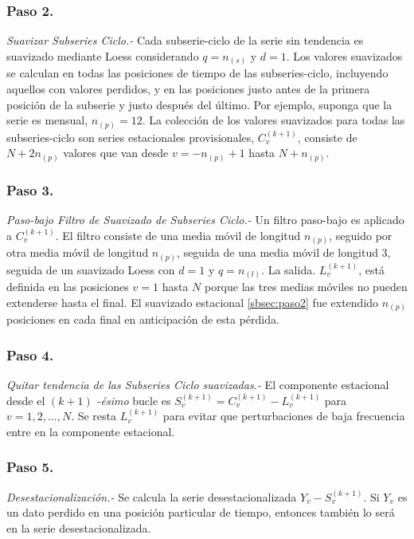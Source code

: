 \documentclass[12pt,oneside]{book}\usepackage[]{graphicx}\usepackage[]{color}
\theoremstyle{definition} %
\begin{document}
\subsubsection{Paso 2.} \textit{Suavizar Subseries Ciclo.-}
\label{sbsec:paso2}
Cada subserie-ciclo de la serie sin tendencia es suavizado mediante Loess considerando $q=n_{(s)}$ y $d=1$. Los valores suavizados se calculan en todas las posiciones de tiempo de las subseries-ciclo, incluyendo aquellos con valores perdidos, y en las posiciones justo antes de la primera posición de la subserie y justo después del último. Por ejemplo, suponga que la serie es mensual, $n_{(p)}=12$. La colección de los valores suavizados para todas las subseries-ciclo son series estacionales provisionales, $C_v^{(k+1)}$, consiste de $N+2n_{(p)}$ valores que van desde $v=-n_{(p)}+1$ hasta $N+n_{(p)}$.  

\subsubsection{Paso 3.} \textit{Paso-bajo Filtro de Suavizado de Subseries Ciclo.-}
\label{sbsec:paso3}
Un filtro paso-bajo es aplicado a $C_v^{(k+1)}$. El filtro consiste de una media móvil de longitud $n_{(p)}$, seguido por otra media móvil de longitud $n_{(p)}$, seguida de una media móvil de longitud $3$, seguida de un suavizado Loess con $d=1$ y $q=n_{(l)}$. La salida. $L_v^{(k+1)}$, está definida en las posiciones $v=1$ hasta $N$ porque las tres medias móviles no pueden extenderse hasta el final. El suavizado estacional \ref{sbsec:paso2}  fue extendido $n_{(p)}$ posiciones en cada final en anticipación de esta pérdida.

\subsubsection{Paso 4.} \textit{Quitar tendencia de las Subseries Ciclo suavizadas.-}
\label{sbsec:paso4}
El componente estacional desde el $(k+1)$ \textit{-ésimo} bucle es $S_v^{(k+1)}=C_v^{(k+1)}-L_v^{(k+1)}$ para  $v=1,2,...,N$. Se resta $L_v^{(k+1)}$ para evitar que perturbaciones de baja frecuencia entre en la componente estacional.

\subsubsection{Paso 5.} \textit{Desestacionalización.-}
\label{sbsec:paso5}
Se calcula la serie desestacionalizada $Y_v-S_v^{(k+1)}$. Si $Y_v$ es un dato perdido en una posición particular de tiempo, entonces también lo será en la serie desestacionalizada.
\end{document}
